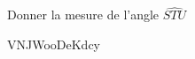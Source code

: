 
\begin{exercice}\label{exo2smath-0224}

    Donner la mesure de l'angle \( \widehat{STU}\)

VNJWooDeKdcy

\end{exercice}
